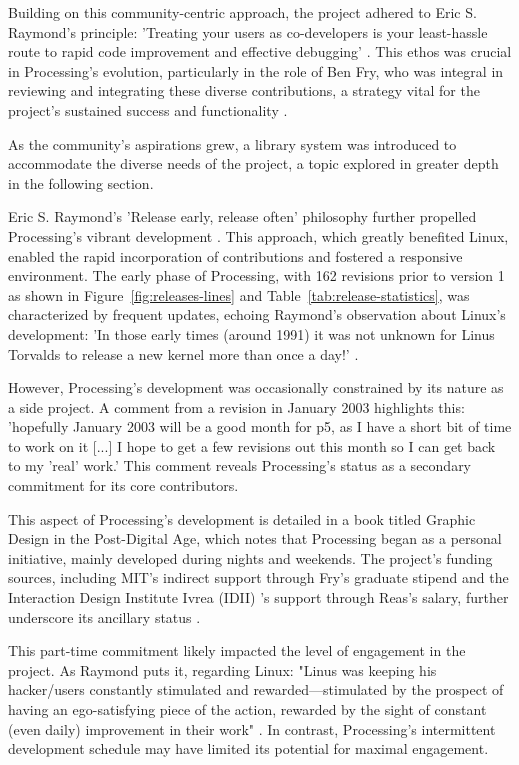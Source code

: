 Building on this community-centric approach, the project adhered to Eric S. Raymond's principle: 'Treating your users as co-developers is your least-hassle route to rapid code improvement and effective debugging' \parencite[27]{raymondCathedralBazaar1999}. This ethos was crucial in Processing's evolution, particularly in the role of Ben Fry, who was integral in reviewing and integrating these diverse contributions, a strategy vital for the project's sustained success and functionality \parencite{fryProcessingContributionGuide2022}.

As the community's aspirations grew, a library system was introduced to accommodate the diverse needs of the project, a topic explored in greater depth in the following section.

Eric S. Raymond's 'Release early, release often' philosophy further propelled Processing's vibrant development \parencite[28]{raymondCathedralBazaar1999}. This approach, which greatly benefited Linux, enabled the rapid incorporation of contributions and fostered a responsive environment. The early phase of Processing, with 162 revisions prior to version 1 as shown in Figure~\ref{fig:releases-lines} and Table~\ref{tab:release-statistics}, was characterized by frequent updates, echoing Raymond's observation about Linux's development: 'In those early times (around 1991) it was not unknown for Linus Torvalds to release a new kernel more than once a day!' \parencite[28]{raymondCathedralBazaar1999}.

However, Processing's development was occasionally constrained by its nature as a side project. A comment from a revision in January 2003 highlights this: 'hopefully January 2003 will be a good month for p5, as I have a short bit of time to work on it [...] I hope to get a few revisions out this month so I can get back to my 'real' work.' This comment reveals Processing's status as a secondary commitment for its core contributors.

This aspect of Processing's development is detailed in a book titled Graphic Design in the Post-Digital Age, which notes that Processing began as a personal initiative, mainly developed during nights and weekends. The project's funding sources, including MIT's indirect support through Fry's graduate stipend and the Interaction Design Institute Ivrea (IDII) 's support through Reas's salary, further underscore its ancillary status \parencite[396]{conradGraphicDesignPostdigital2021}.

This part-time commitment likely impacted the level of engagement in the project. As Raymond puts it, regarding Linux: "Linus was keeping his hacker/users constantly stimulated and rewarded—stimulated by the prospect of having an ego-satisfying piece of the action, rewarded by the sight of constant (even daily) improvement in their work" \parencite[28]{raymondCathedralBazaar1999}. In contrast, Processing's intermittent development schedule may have limited its potential for maximal engagement.

